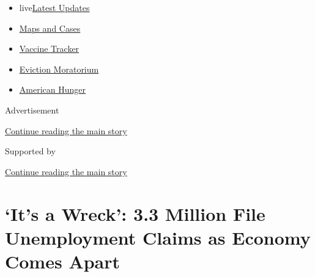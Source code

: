 \begin{itemize}
\tightlist
\item
  live\href{https://www.nytimes3xbfgragh.onion/2020/09/08/world/covid-19-coronavirus.html?name=styln-coronavirus-markets\&region=TOP_BANNER\&block=storyline_menu_recirc\&action=click\&pgtype=Article\&impression_id=9c5aab51-f1d4-11ea-9feb-8792ec8b6371\&variant=undefined}{Latest
  Updates}
\item
  \href{https://www.nytimes3xbfgragh.onion/interactive/2020/us/coronavirus-us-cases.html?name=styln-coronavirus-markets\&region=TOP_BANNER\&block=storyline_menu_recirc\&action=click\&pgtype=Article\&impression_id=9c5aab52-f1d4-11ea-9feb-8792ec8b6371\&variant=undefined}{Maps
  and Cases}
\item
  \href{https://www.nytimes3xbfgragh.onion/interactive/2020/science/coronavirus-vaccine-tracker.html?name=styln-coronavirus-markets\&region=TOP_BANNER\&block=storyline_menu_recirc\&action=click\&pgtype=Article\&impression_id=9c5aab53-f1d4-11ea-9feb-8792ec8b6371\&variant=undefined}{Vaccine
  Tracker}
\item
  \href{https://www.nytimes3xbfgragh.onion/2020/09/02/your-money/eviction-moratorium-covid.html?name=styln-coronavirus-markets\&region=TOP_BANNER\&block=storyline_menu_recirc\&action=click\&pgtype=Article\&impression_id=9c5ad260-f1d4-11ea-9feb-8792ec8b6371\&variant=undefined}{Eviction
  Moratorium}
\item
  \href{https://www.nytimes3xbfgragh.onion/interactive/2020/09/02/magazine/food-insecurity-hunger-us.html?name=styln-coronavirus-markets\&region=TOP_BANNER\&block=storyline_menu_recirc\&action=click\&pgtype=Article\&impression_id=9c5ad261-f1d4-11ea-9feb-8792ec8b6371\&variant=undefined}{American
  Hunger}
\end{itemize}

Advertisement

\protect\hyperlink{after-top}{Continue reading the main story}

Supported by

\protect\hyperlink{after-sponsor}{Continue reading the main story}

\hypertarget{its-a-wreck-33-million-file-unemployment-claims-as-economy-comes-apart}{%
\section{`It's a Wreck': 3.3 Million File Unemployment Claims as Economy
Comes
Apart}\label{its-a-wreck-33-million-file-unemployment-claims-as-economy-comes-apart}}

